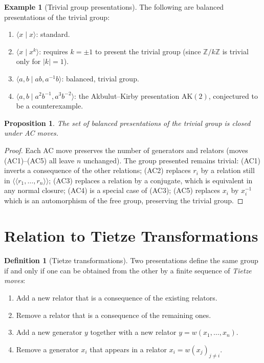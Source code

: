 \documentclass[12pt,a4paper]{amsart}
\newtheorem{proposition}[theorem]{Proposition}
\theoremstyle{definition}
\newtheorem{definition}[theorem]{Definition}
\newtheorem{example}[theorem]{Example}
\theoremstyle{remark}
\begin{document}
\begin{example}[Trivial group presentations]\label{ex:trivial}
The following are balanced presentations of the trivial group:
\begin{enumerate}[label=(\alph*)]
  \item $\langle x \mid x \rangle$: standard.
  \item $\langle x \mid x^k \rangle$: requires $k = \pm 1$ to present the trivial
        group (since $\mathbb{Z}/k\mathbb{Z}$ is trivial only for $|k|=1$).
  \item $\langle a, b \mid ab, a^{-1}b \rangle$: balanced, trivial group.
  \item $\langle a, b \mid a^2 b^{-1}, a^3 b^{-2} \rangle$: the Akbulut--Kirby
        presentation $\mathrm{AK}(2)$, conjectured to be a counterexample.
\end{enumerate}
\end{example}

\begin{proposition}
The set of balanced presentations of the trivial group is closed under AC moves.
\end{proposition}

\begin{proof}
Each AC move preserves the number of generators and relators (moves (AC1)--(AC5)
all leave $n$ unchanged). The group presented remains trivial: (AC1) inverts a
consequence of the other relations; (AC2) replaces $r_i$ by a relation still
in $\langle\!\langle r_1,\ldots,r_n \rangle\!\rangle$; (AC3) replaces a relation
by a conjugate, which is equivalent in any normal closure; (AC4) is a special
case of (AC3); (AC5) replaces $x_i$ by $x_i^{-1}$ which is an automorphism of
the free group, preserving the trivial group.
\end{proof}

\section{Relation to Tietze Transformations}

\begin{definition}[Tietze transformations]
Two presentations define the same group if and only if one can be obtained from
the other by a finite sequence of \emph{Tietze moves}:
\begin{enumerate}[label=(T\arabic*)]
  \item Add a new relator that is a consequence of the existing relators.
  \item Remove a relator that is a consequence of the remaining ones.
  \item Add a new generator $y$ together with a new relator $y = w(x_1,\ldots,x_n)$.
  \item Remove a generator $x_i$ that appears in a relator $x_i = w(x_j)_{j \neq i}$.
\end{enumerate}
\end{definition}
\end{document}
